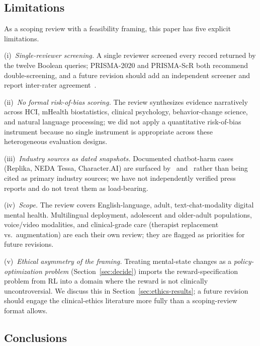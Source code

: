 \documentclass[11pt,a4paper]{article}
\newcommand{\secref}[1]{Section~\ref{#1}}
\begin{document}
\subsection{Limitations}\label{sec:limitations}

As a scoping review with a feasibility framing, this paper has
five explicit limitations.

(i)~\emph{Single-reviewer screening.} A single reviewer screened
every record returned by the twelve Boolean queries; PRISMA-2020
and PRISMA-ScR both recommend double-screening, and a future
revision should add an independent screener and report
inter-rater agreement~\cite{Tricco2018PRISMAScR,Page2021PRISMA}.

(ii)~\emph{No formal risk-of-bias scoring.} The review synthesizes
evidence narratively across HCI, mHealth biostatistics, clinical
psychology, behavior-change science, and natural language
processing; we did not apply a quantitative risk-of-bias
instrument because no single instrument is appropriate across
these heterogeneous evaluation designs.

(iii)~\emph{Industry sources as dated snapshots.} Documented
chatbot-harm cases (Replika, NEDA Tessa, Character.AI) are
surfaced by~\cite{DeFreitas2024ChatbotSafety} and~\cite{Scholich2025TherapistVsChatbot}
rather than being cited as primary industry sources; we have not
independently verified press reports and do not treat them as
load-bearing.

(iv)~\emph{Scope.} The review covers English-language, adult,
text-chat-modality digital mental health. Multilingual deployment,
adolescent and older-adult populations, voice/video modalities, and
clinical-grade care (therapist replacement vs.\ augmentation) are
each their own review; they are flagged as priorities for future
revisions.

(v)~\emph{Ethical asymmetry of the framing.} Treating
mental-state changes as a \emph{policy-optimization problem}
(\secref{sec:decide}) imports the reward-specification problem
from RL into a domain where the reward is not clinically
uncontroversial. We discuss this in \secref{sec:ethics-results}; a
future revision should engage the clinical-ethics literature more
fully than a scoping-review format allows.

\subsection{Conclusions}\label{sec:conclusions}
\end{document}
